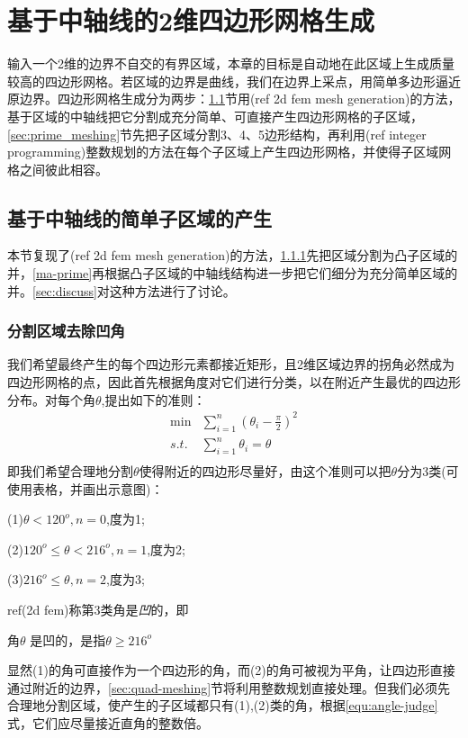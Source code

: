 \chapter{基于中轴线的2维四边形网格生成}\label{chap:maquad}
输入一个2维的边界不自交的有界区域，本章的目标是自动地在此区域上生成质量较高的四边形网格。若区域的边界是曲线，我们在边界上采点，用简单多边形逼近原边界。四边形网格生成分为两步：\ref{sec:ma_subdivion}节用(ref 2d fem mesh generation)的方法，基于区域的中轴线把它分割成充分简单、可直接产生四边形网格的子区域，\ref{sec:prime_meshing}节先把子区域分割3、4、5边形结构，再利用(ref integer programming)整数规划的方法在每个子区域上产生四边形网格，并使得子区域网格之间彼此相容。

\section{基于中轴线的简单子区域的产生}\label{sec:ma_subdivion}
本节复现了(ref 2d fem mesh generation)的方法，\ref{sec:cocavity-removal}先把区域分割为凸子区域的并，\ref{ma-prime}再根据凸子区域的中轴线结构进一步把它们细分为充分简单区域的并。\ref{sec:discuss}对这种方法进行了讨论。
\subsection{分割区域去除凹角}\label{sec:cocavity-removal}
我们希望最终产生的每个四边形元素都接近矩形，且2维区域边界的拐角必然成为四边形网格的点，因此首先根据角度对它们进行分类，以在附近产生最优的四边形分布。对每个角$\theta$,提出如下的准则：
\begin{equation} \label{equ:angle-judge}
\begin{split}
\min  &{\sum_{i=1}^n(\theta_i-\frac{\pi}{2})^2}\\
s.t.\,  &\sum_{i=1}^{n}\theta_i=\theta\\
\end{split}
\end{equation}
即我们希望合理地分割$\theta$使得附近的四边形尽量好，由这个准则可以把$\theta$分为3类(可使用表格，并画出示意图)：
	
(1)$\theta < 120^o,n=0$,度为1;

(2)$120^o \leq \theta < 216^o,n=1$,度为2;

(3)$216^o \leq \theta,n=2$,度为3;

ref(2d fem)称第3类角是\emph{凹}的，即
\begin{definition}\label{def:concave}
	角$\theta$ 是凹的，是指$\theta \geq 216^o$
\end{definition}
显然(1)的角可直接作为一个四边形的角，而(2)的角可被视为平角，让四边形直接通过附近的边界，\ref{sec:quad-meshing}节将利用整数规划直接处理。但我们必须先合理地分割区域，使产生的子区域都只有(1),(2)类的角，根据\ref{equ:angle-judge}式，它们应尽量接近直角的整数倍。

